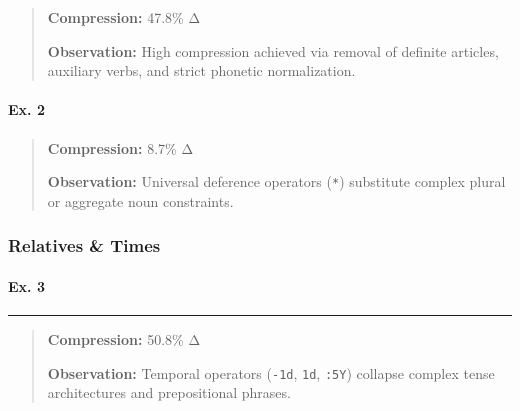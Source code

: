 \begin{quote}
\textbf{Compression:} 47.8\% Δ

\textbf{Observation:} High compression achieved via removal of definite
articles, auxiliary verbs, and strict phonetic normalization.
\end{quote}

\paragraph{Ex. 2}\label{ex.-2}

\begin{Shaded}
\begin{Highlighting}[]
\end{Highlighting}
\end{Shaded}

\begin{quote}
\textbf{Compression:} 8.7\% Δ

\textbf{Observation:} Universal deference operators (\texttt{*})
substitute complex plural or aggregate noun constraints.
\end{quote}

\subsubsection{Relatives \& Times}\label{relatives-times}

\paragraph{Ex. 3}\label{ex.-3}

\begin{Shaded}
\begin{Highlighting}[]
\end{Highlighting}
\end{Shaded}

\begin{center}\rule{0.5\linewidth}{0.5pt}\end{center}

\begin{quote}
\textbf{Compression:} 50.8\% Δ

\textbf{Observation:} Temporal operators (\texttt{-1d}, \texttt{1d},
\texttt{:5Y}) collapse complex tense architectures and prepositional
phrases.
\end{quote}

